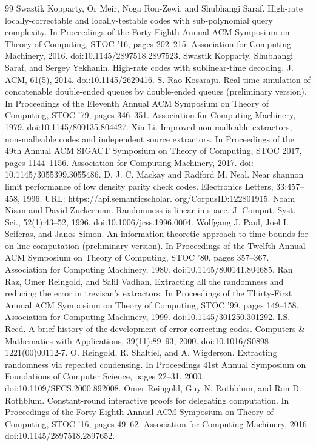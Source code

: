 \documentclass[10pt,a4paper]{article}
\begin{document}
\begin{thebibliography}{99}
 Swastik Kopparty, Or Meir, Noga Ron-Zewi, and Shubhangi Saraf. High-rate locally-correctable and locally-testable codes with sub-polynomial query complexity. In Proceedings of the Forty-Eighth Annual ACM Symposium on Theory of Computing, STOC ’16, pages 202–215. Association for Computing Machinery, 2016. doi:10.1145/2897518.2897523.
 Swastik Kopparty, Shubhangi Saraf, and Sergey Yekhanin. High-rate codes with sublinear-time decoding. J. ACM, 61(5), 2014. doi:10.1145/2629416.
 S. Rao Kosaraju. Real-time simulation of concatenable double-ended queues by double-ended queues (preliminary version). In Proceedings of the Eleventh Annual ACM Symposium on Theory of Computing, STOC ’79, pages 346–351. Association for Computing Machinery, 1979. doi:10.1145/800135.804427.
 Xin Li. Improved non-malleable extractors, non-malleable codes and independent source extractors. In Proceedings of the 49th Annual ACM SIGACT Symposium on Theory of Computing, STOC 2017, pages 1144–1156. Association for Computing Machinery, 2017. doi: 10.1145/3055399.3055486.
 D. J. C. Mackay and Radford M. Neal. Near shannon limit performance of low density parity check codes. Electronics Letters, 33:457–458, 1996. URL: https://api.semanticscholar. org/CorpusID:122801915.
 Noam Nisan and David Zuckerman. Randomness is linear in space. J. Comput. Syst. Sci., 52(1):43–52, 1996. doi:10.1006/jcss.1996.0004.
 Wolfgang J. Paul, Joel I. Seiferas, and Janos Simon. An information-theoretic approach to time bounds for on-line computation (preliminary version). In Proceedings of the Twelfth Annual ACM Symposium on Theory of Computing, STOC ’80, pages 357–367. Association for Computing Machinery, 1980. doi:10.1145/800141.804685.
 Ran Raz, Omer Reingold, and Salil Vadhan. Extracting all the randomness and reducing the error in trevisan’s extractors. In Proceedings of the Thirty-First Annual ACM Symposium on Theory of Computing, STOC ’99, pages 149–158. Association for Computing Machinery, 1999. doi:10.1145/301250.301292.
 I.S. Reed. A brief history of the development of error correcting codes. Computers \& Mathematics with Applications, 39(11):89–93, 2000. doi:10.1016/S0898-1221(00)00112-7.
 O. Reingold, R. Shaltiel, and A. Wigderson. Extracting randomness via repeated condensing. In Proceedings 41st Annual Symposium on Foundations of Computer Science, pages 22–31, 2000. doi:10.1109/SFCS.2000.892008.
 Omer Reingold, Guy N. Rothblum, and Ron D. Rothblum. Constant-round interactive proofs for delegating computation. In Proceedings of the Forty-Eighth Annual ACM Symposium on Theory of Computing, STOC ’16, pages 49–62. Association for Computing Machinery, 2016. doi:10.1145/2897518.2897652.

\end{thebibliography}
\end{document}
